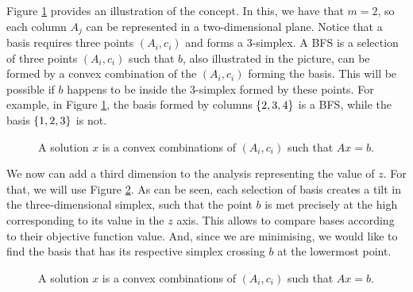 Figure \ref{p1c4:fig:column_geometry} provides an illustration of the concept. In this, we have that $m=2$, so each column $A_j$ can be represented in a two-dimensional plane. Notice that a basis requires three points $(A_i,c_i)$ and forms a 3-simplex. A BFS is a selection of three points $(A_i,c_i)$ such that $b$, also illustrated in the picture, can be formed by a convex combination of the $(A_i,c_i)$ forming the basis. This will be possible if $b$ happens to be inside the 3-simplex formed by these points. For example, in Figure \ref{p1c4:fig:column_geometry}, the basis formed by columns $\left\{ 2,3,4 \right \}$ is a BFS, while the basis $\left\{ 1,2,3 \right \}$ is not.

\begin{figure}[h]
	\caption{A solution $x$ is a convex combinations of $(A_i,c_i)$ such that $Ax= b$.} \label{p1c4:fig:column_geometry}
\end{figure}	 

We now can add a third dimension to the analysis representing the value of $z$. For that, we will use Figure \ref{p1c4:fig:column_geometry_3d}. As can be seen, each selection of basis creates a tilt in the three-dimensional simplex, such that the point $b$ is met precisely at the high corresponding to its value in the $z$ axis. This allows to compare bases according to their objective function value. And, since we are minimising, we would like to find the basis that has its respective simplex crossing $b$ at the lowermost point.

\begin{figure}[H]
	\caption{A solution $x$ is a convex combinations of $(A_i,c_i)$ such that $Ax= b$.} \label{p1c4:fig:column_geometry_3d}
\end{figure}	

